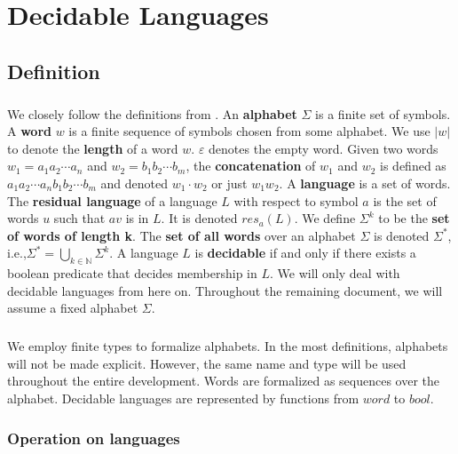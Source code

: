 \chapter{Decidable Languages}

\section{Definition}
\paragraph{}
We closely follow the definitions from \cite{DBLP:books/daglib/0011126}.
An \textbf{alphabet} $\Sigma$ is a finite set of symbols. 
A \textbf{word} $w$ is a finite sequence of symbols chosen from some alphabet. 
We use $|w|$ to denote the \textbf{length} of a word $w$. $\varepsilon$ denotes the empty word.
Given two words $w_1 = a_1 a_2 \cdots a_n$ and $w_2 = b_1 b_2 \cdots b_m$, the \textbf{concatenation} of $w_1$ and $w_2$ is defined as $a_1 a_2 \cdots a_n b_1 b_2 \cdots b_m$ and denoted $w_1 \cdot w_2$ or just $w_1 w_2$.
A \textbf{language} is a set of words.
The \textbf{residual language} of a language $L$ with respect to symbol $a$ is the set of words $u$ such that $a v$ is in $L$. It is denoted $res_a(L)$.
We define $\Sigma^k$ to be the \textbf{set of words of length k}.
The \textbf{set of all words} over an alphabet $\Sigma$ is denoted $\Sigma^*$, i.e.,$\Sigma^* = \bigcup_{k \in \mathbb{N}} \Sigma^k$.
A language $L$ is \textbf{decidable} if and only if there exists a boolean predicate that decides membership in $L$.
We will only deal with decidable languages from here on.
Throughout the remaining document, we will assume a fixed alphabet $\Sigma$.

    \paragraph{} 
    We employ finite types to formalize alphabets. 
    In the most definitions, alphabets will not be made explicit.
    However, the same name and type will be used throughout the entire development.
    Words are formalized as sequences over the alphabet.
    Decidable languages are represented by functions from $word$ to $bool$.

    \subsection{Operation on languages}


